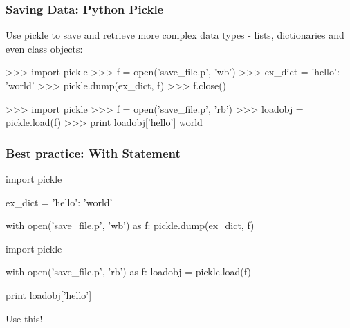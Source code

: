 \begin{frame}[fragile]
  \frametitle{Saving Data: Python Pickle}

  Use pickle to save and retrieve more complex data types - lists,
  dictionaries and even class objects:

  \bigskip\pause

  \begin{mlinepython}
    >>> import pickle 
    >>> f = open('save_file.p', 'wb')
    >>> ex_dict = {'hello': 'world'}
    >>> pickle.dump(ex_dict, f)
    >>> f.close()
  \end{mlinepython}

  \bigskip\pause

  \begin{mlinepython}
    >>> import pickle 
    >>> f = open('save_file.p', 'rb')
    >>> loadobj = pickle.load(f)
    >>> print loadobj['hello']
    world
  \end{mlinepython}

\end{frame}


\begin{frame}[fragile]
  \frametitle{Best practice: With Statement}


  \begin{mlinepython}
    import pickle 

    ex_dict = {'hello': 'world'}

    with open('save_file.p', 'wb') as f:
        pickle.dump(ex_dict, f)
  \end{mlinepython}

  \bigskip \pause
  \vspace{0.2cm}

  \begin{mlinepython}
    import pickle 

    with open('save_file.p', 'rb') as f:
        loadobj = pickle.load(f)

    print loadobj['hello']
  \end{mlinepython}
  \vspace{0.15cm}
  \begin{arrowlist}
  \item Use this!
  \end{arrowlist}

\end{frame}


